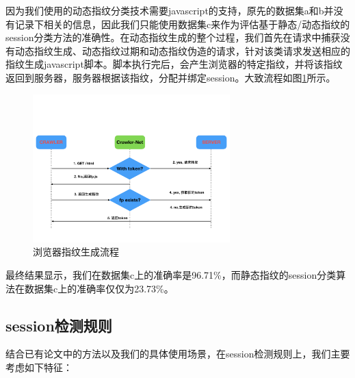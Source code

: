 \documentclass[doctor,privacy,twoside]{buaa_mac}
\begin{document}
因为我们使用的动态指纹分类技术需要javascript的支持，原先的数据集a和b并没有记录下相关的信息，因此我们只能使用数据集c来作为评估基于静态/动态指纹的session分类方法的准确性。在动态指纹生成的整个过程，我们首先在请求中捕获没有动态指纹生成、动态指纹过期和动态指纹伪造的请求，针对该类请求发送相应的指纹生成javascript脚本。脚本执行完后，会产生浏览器的特定指纹，并将该指纹返回到服务器，服务器根据该指纹，分配并绑定session。大致流程如图\ref{fig:fp}所示。

\begin{figure}[!h]
  \centering
  \includegraphics[width=0.68\textwidth]{images/fingerprint_generation.png}
  \caption{浏览器指纹生成流程}
  \label{fig:fp}
\end{figure}

最终结果显示，我们在数据集c上的准确率是96.71\%，而静态指纹的session分类算法在数据集c上的准确率仅仅为23.73\%。


\subsection{session检测规则}

结合已有论文中的方法以及我们的具体使用场景，在session检测规则上，我们主要考虑如下特征：
\end{document}
